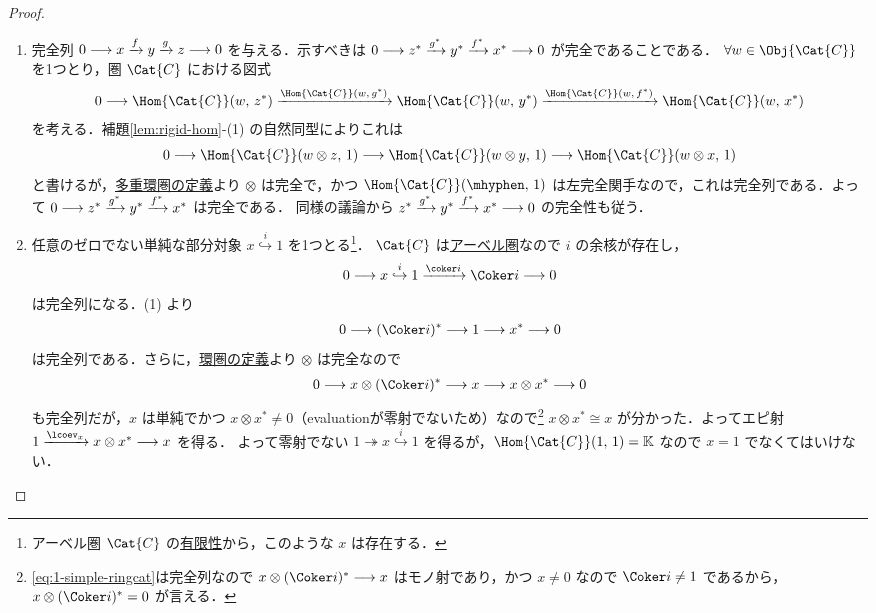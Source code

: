 \documentclass[TQFT_main]{subfiles}
\begin{document}
\begin{proof}
    \begin{enumerate}
        \item 完全列 $0 \longrightarrow x \xrightarrow{f} y \xrightarrow{g} z \longrightarrow 0$ を与える．示すべきは $0 \longrightarrow z^* \xrightarrow{g^*} y^* \xrightarrow{f^*} x^* \longrightarrow 0$ が完全であることである．
        $\forall w \in \Obj{\Cat{C}}$ を1つとり，圏 $\Cat{C}$ における図式
        \begin{align}
            0 \lto \Hom{\Cat{C}}(w,\, z^*) \xrightarrow{\Hom{\Cat{C}}(w,\, g^*)} \Hom{\Cat{C}}(w,\, y^*) \xrightarrow{\Hom{\Cat{C}}(w,\, f^*)} \Hom{\Cat{C}}(w,\, x^*)
        \end{align}
        を考える．補題\ref{lem:rigid-hom}-(1) の自然同型によりこれは
        \begin{align}
            0 \lto \Hom{\Cat{C}}(w \otimes z,\, 1) \lto \Hom{\Cat{C}}(w \otimes y,\, 1) \lto \Hom{\Cat{C}}(w \otimes x,\, 1)
        \end{align}
        と書けるが，\hyperref[def:ringcat]{多重環圏の定義}より $\otimes$ は完全で，かつ $\Hom{\Cat{C}}(\mhyphen,\, 1)$ は左完全関手なので，これは完全列である．よって $0 \longrightarrow z^* \xrightarrow{g^*} y^* \xrightarrow{f^*} x^*$ は完全である．
        同様の議論から $z^* \xrightarrow{g^*} y^* \xrightarrow{f^*} x^* \longrightarrow 0$ の完全性も従う．

        \item 任意のゼロでない単純な部分対象 $x \overset{i}{\hookrightarrow} 1$ を1つとる\footnote{アーベル圏 $\Cat{C}$ の\hyperref[def:finite-abcat]{有限性}から，このような $x$ は存在する．}．
        $\Cat{C}$ は\hyperref[def:additivecat]{アーベル圏}なので $i$ の余核が存在し，
        \begin{align}
            0 \lto x \overset{i}{\hookrightarrow} 1 \xrightarrow{\coker i} \Coker i \lto 0
        \end{align}
        は完全列になる．(1) より
        \begin{align}
            0 \lto (\Coker i)^* \lto 1 \lto x^* \lto 0
        \end{align}
        は完全列である．さらに，\hyperref[def:ringcat]{環圏の定義}より $\otimes$ は完全なので
        \begin{align}
            \label{eq:1-simple-ringcat}
            0 \lto x \otimes (\Coker i)^* \lto x \lto x \otimes x^* \lto 0
        \end{align}
        も完全列だが，$x$ は単純でかつ $x \otimes x^* \neq 0$（evaluationが零射でないため）なので\footnote{\eqref{eq:1-simple-ringcat}は完全列なので $x \otimes (\Coker i)^* \lto x$ はモノ射であり，かつ $x \neq 0$ なので $\Coker i \neq 1$ であるから，$x \otimes (\Coker i)^* = 0$ が言える．} $x \otimes x^* \cong x$ が分かった．よってエピ射 $1 \xrightarrow{\lcoev_x} x \otimes x^* \lto x$ を得る．
        よって零射でない $1 \twoheadrightarrow x \overset{i}{\hookrightarrow} 1$ を得るが，$\Hom{\Cat{C}}(1,\, 1) = \mathbb{K}$ なので $x = 1$ でなくてはいけない．
    \end{enumerate}
\end{proof}
\end{document}
